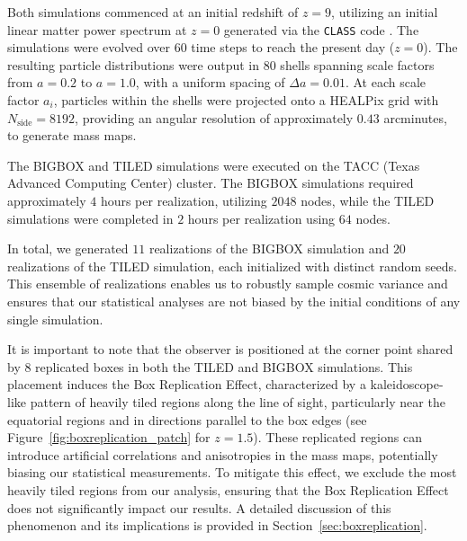 Both simulations commenced at an initial redshift of $z = 9$, utilizing an initial linear matter power spectrum at $z = 0$ generated via the \texttt{CLASS} code \citep{2011JCAP...07..034B}. The simulations were evolved over $60$ time steps to reach the present day ($z = 0$). The resulting particle distributions were output in $80$ shells spanning scale factors from $a = 0.2$ to $a = 1.0$, with a uniform spacing of $\Delta a = 0.01$. At each scale factor $a_i$, particles within the shells were projected onto a HEALPix grid \citep{Górski_2005} with $N_{\text{side}} = 8192$, providing an angular resolution of approximately $0.43$ arcminutes, to generate mass maps.

The BIGBOX and TILED simulations were executed on the TACC (Texas Advanced Computing Center) cluster. The BIGBOX simulations required approximately $4$ hours per realization, utilizing $2048$ nodes, while the TILED simulations were completed in $2$ hours per realization using $64$ nodes.

In total, we generated $11$ realizations of the BIGBOX simulation and $20$ realizations of the TILED simulation, each initialized with distinct random seeds. This ensemble of realizations enables us to robustly sample cosmic variance and ensures that our statistical analyses are not biased by the initial conditions of any single simulation.

It is important to note that the observer is positioned at the corner point shared by $8$ replicated boxes in both the TILED and BIGBOX simulations. This placement induces the Box Replication Effect, characterized by a kaleidoscope-like pattern of heavily tiled regions along the line of sight, particularly near the equatorial regions and in directions parallel to the box edges (see Figure~\ref{fig:boxreplication_patch} for $z = 1.5$). These replicated regions can introduce artificial correlations and anisotropies in the mass maps, potentially biasing our statistical measurements. To mitigate this effect, we exclude the most heavily tiled regions from our analysis, ensuring that the Box Replication Effect does not significantly impact our results. A detailed discussion of this phenomenon and its implications is provided in Section~\ref{sec:boxreplication}.

